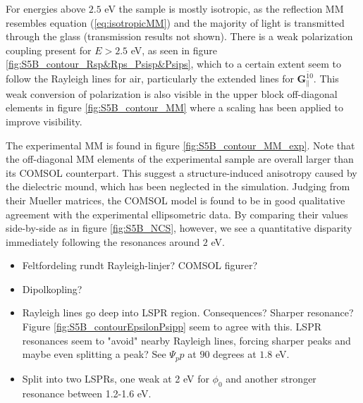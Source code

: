 For energies above $2.5$ eV the sample is mostly isotropic, as the reflection MM resembles equation (\ref{eq:isotropicMM}) and the majority of light is transmitted through the glass (transmission results not shown). There is a weak polarization coupling present for $E>2.5$ eV, as seen in figure \ref{fig:S5B_contour_Rsp&Rps_Psisp&Psips}, which to a certain extent seem to follow the Rayleigh lines for air, particularly the extended lines for $\mathbf{G}_\parallel^{\bar{1}0}$. This weak conversion of polarization is also visible in the upper block off-diagonal elements in figure \ref{fig:S5B_contour_MM} where a scaling has been applied to improve visibility. 



The experimental MM is found in figure \ref{fig:S5B_contour_MM_exp}. Note that the off-diagonal MM elements of the experimental sample are overall larger than its COMSOL counterpart. This suggest a structure-induced anisotropy caused by the dielectric mound, which has been neglected in the simulation. Judging from their Mueller matrices, the COMSOL model is found to be in good qualitative agreement with the experimental ellipsometric data. By comparing their values side-by-side as in figure \ref{fig:S5B_NCS}, however, we see a quantitative disparity immediately following the resonances around $2$ eV.

\begin{itemize}

    \item Feltfordeling rundt Rayleigh-linjer? COMSOL figurer?
    \item Dipolkopling?
    \item Rayleigh lines go deep into LSPR region. Consequences? Sharper resonance? Figure \ref{fig:S5B_contourEpsilonPsipp} seem to agree with this. LSPR resonances seem to "avoid" nearby Rayleigh lines, forcing sharper peaks and maybe even splitting a peak? See $\Psi_pp$ at $90$ degrees at $1.8$ eV.
    \item Split into two LSPRs, one weak at 2 eV for $\phi_0$ and another stronger resonance between 1.2-1.6 eV.
\end{itemize}


